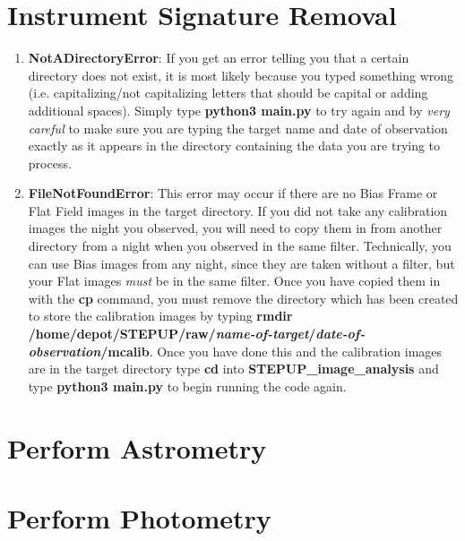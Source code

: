 \documentclass[11pt]{report}
\begin{document}
\section{Instrument Signature Removal}
\begin{enumerate}
\item {\bf NotADirectoryError}: If you get an error telling you that a certain directory does not exist, it is most likely because you typed something wrong (i.e. capitalizing/not capitalizing letters that should be capital or adding additional spaces). Simply type {\bf python3 main.py} to try again and by \emph{very careful} to make sure you are typing the target name and date of observation exactly as it appears in the directory containing the data you are trying to process.
\item {\bf FileNotFoundError}: This error may occur if there are no Bias Frame or Flat Field images in the target directory. If you did not take any calibration images the night you observed, you will need to copy them in from another directory from a night when you observed in the same filter. Technically, you can use Bias images from any night, since they are taken without a filter, but your Flat images \emph{must} be in the same filter. Once you have copied them in with the {\bf cp} command, you must remove the directory which has been created to store the calibration images by typing {\bf rmdir /home/depot/STEPUP/raw/\emph{name-of-target}/\emph{date-of-observation}/mcalib}. Once you have done this and the calibration images are in the target directory type {\bf cd} into {\bf STEPUP\_image\_analysis} and type {\bf python3 main.py} to begin running the code again.
\end{enumerate}
\section{Perform Astrometry}
\section{Perform Photometry}

\end{document}
